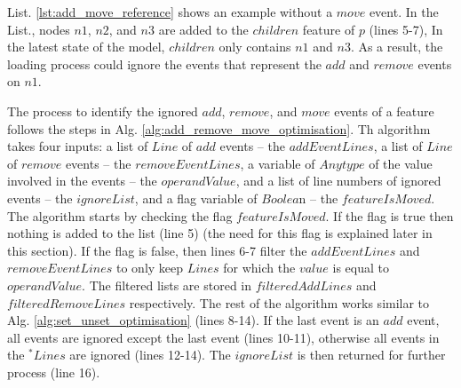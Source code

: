 \documentclass{llncs}
\begin{document}
{List. \ref{lst:add_move_reference} shows an example without a $move$ event. In the List., nodes $n1$, $n2$, and $n3$ are added to the $children$ feature of $p$ (lines 5-7), In the latest state of the model, $children$ only contains $n1$ and $n3$. As a result, the loading process could ignore the events that represent the \textit{$add$} and \textit{$remove$} events on $n1$. 

The process to identify the ignored $add$, $remove$, and $move$ events of a feature follows the steps in Alg. \ref{alg:add_remove_move_optimisation}. Th algorithm takes four inputs: a list of $Line$ of $add$ events -- the $addEventLines$, a list of $Line$ of $remove$ events -- the $removeEventLines$, a variable of $Anytype$ of the value involved in the events -- the $operandValue$, and a list of line numbers of ignored events -- the $ignoreList$, and a flag variable of $Boolea$n -- the $featureIsMoved$. The algorithm starts by checking the flag $featureIsMoved$. If the flag is true then nothing is added to the list (line 5) (the need for this flag is explained later in this section). If the flag is false, then lines 6-7 filter the $addEventLines$ and $removeEventLines$ to only keep $Lines$ for which the $value$ is equal to $operandValue$. The filtered lists are stored in $filteredAddLines$ and $filteredRemoveLines$ respectively. The rest of the algorithm works similar to Alg. \ref{alg:set_unset_optimisation} (lines 8-14). If the last event is an $add$ event, all events are ignored except the last event (lines 10-11), otherwise all events in the $^*Lines$ are ignored (lines 12-14). The $ignoreList$ is then returned for further process (line 16).

}
\end{document}
